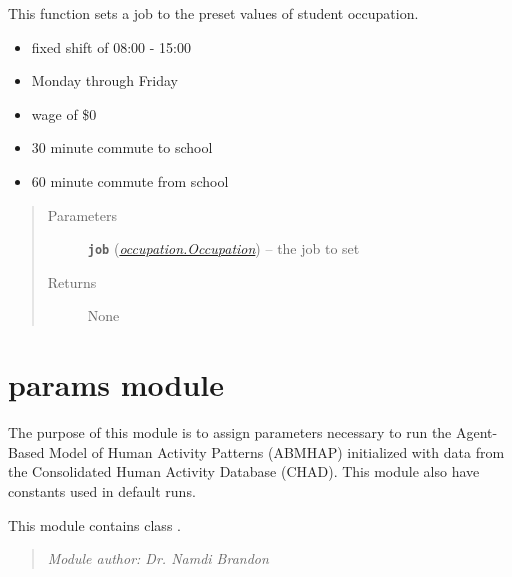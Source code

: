 \documentclass[letterpaper,10pt,english]{sphinxmanual}
\begin{document}
\begin{fulllineitems}
\label{occupation:occupation.set_student}
This function sets a job to the preset values of student occupation.
\begin{itemize}
\item {} 
fixed shift of 08:00 - 15:00

\item {} 
Monday through Friday

\item {} 
wage of \$0

\item {} 
30 minute commute to school

\item {} 
60 minute commute from school

\end{itemize}
\begin{quote}\begin{description}
\item[{Parameters}] \leavevmode
\textbf{\texttt{job}} ({\hyperref[occupation:occupation.Occupation]{\emph{\emph{occupation.Occupation}}}}) -- the job to set

\item[{Returns}] \leavevmode
None

\end{description}\end{quote}

\end{fulllineitems}



\section{params module}
\label{params::doc}\label{params:params-module}\label{params:module-params}
The purpose of this module is to assign parameters necessary to run the Agent-Based Model of Human Activity Patterns (ABMHAP) initialized with data from the Consolidated Human Activity Database (CHAD). This module also have constants used in default runs.

This module contains class {\hyperref[params:params.Params]{\emph{}}}.
\begin{quote}

\emph{Module author: Dr. Namdi Brandon}
\end{quote}
\end{document}
